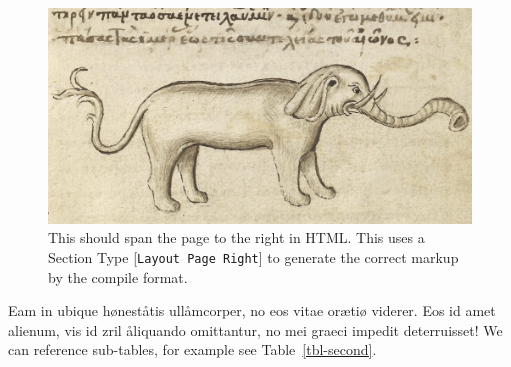 \documentclass[
  12pt,
  a4paper,
  oneside]{scrbook}
\begin{document}
\begin{figure}

{\centering \includegraphics{Elephant1.jpg}

}

\caption{\label{fig-elespan3}This should span the page to the right in
HTML. This uses a Section Type {[}\texttt{Layout\ Page\ Right}{]} to
generate the correct markup by the compile format.}

\end{figure}

\protect\hypertarget{scriv19}{}{}

Eam in ubique høneståtis ullåmcorper, no eos vitae orætiø viderer. Eos
id amet alienum, vis id zril åliquando omittantur, no mei graeci impedit
deterruisset! We can reference sub-tables, for example see
\protect\hypertarget{cite_28}{}{\label{cite_28}Table~\ref{tbl-second}}.
\end{document}
